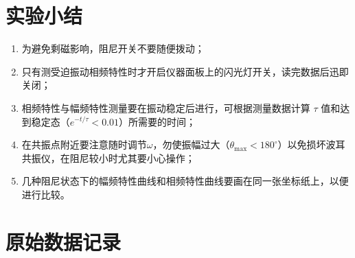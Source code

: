 \documentclass[12pt,a4paper]{amsart}
\begin{document}
\section{实验小结}

\begin{enumerate}
    \item 为避免剩磁影响，阻尼开关不要随便拨动；
    \item 只有测受迫振动相频特性时才开启仪器面板上的闪光灯开关，读完数据后迅即关闭；
    \item 相频特性与幅频特性测量要在振动稳定后进行，可根据测量数据计算 $\tau$ 值和达到稳定态（$e^{-t/\tau}<0.01$）所需要的时间；
    \item 在共振点附近要注意随时调节$\omega$，勿使振幅过大（$\theta_{\text{max}}<180^\circ$）以免损坏波耳共振仪，在阻尼较小时尤其要小心操作；
    \item 几种阻尼状态下的幅频特性曲线和相频特性曲线要画在同一张坐标纸上，以便进行比较。
\end{enumerate}

\section{原始数据记录}


\appendix



{\footnotesize}
\end{document}
